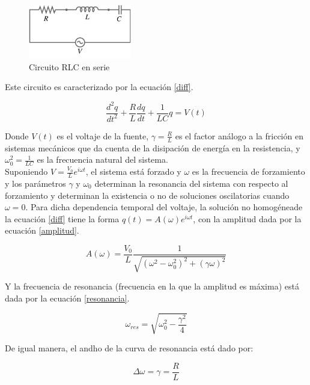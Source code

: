 \documentclass[prb,aps,twocolumn,preprintnumbers,amsmath,amssymb]{revtex4}
\begin{document}
\begin{figure}[h!]
	\centering
	\includegraphics[width=0.4\textwidth]{RLC}
	\caption{Circuito RLC en serie}
	\label{fig: RLC}
\end{figure}

Este circuito es caracterizado por la ecuación \eqref{diff}.

\begin{equation}
\label{diff}
\frac{d^2 q}{d t^2} + \frac{R}{L}\frac{d q}{d t} + \frac{1}{LC}q = V(t)
\end{equation}

Donde $V(t)$ es el voltaje de la fuente, $\gamma = \frac{R}{L}$ es el factor análogo a la fricción en sistemas mecánicos que da cuenta de la disipación de energía en la resistencia, y $\omega_{0}^2 = \frac{1}{LC}$ es la frecuencia natural del sistema.\\

Suponiendo $V = \frac{V_{0}}{L} e^{i\omega t}$, el sistema está forzado y $\omega$ es la frecuencia de forzamiento y los parámetros $\gamma$ y $\omega_{0}$ determinan la resonancia del sistema con respecto al forzamiento  y determinan la existencia o no de soluciones oscilatorias cuando $\omega = 0$. Para dicha dependencia temporal del voltaje, la solución no homogénea\footnotemark[1] de la ecuación \eqref{diff} tiene la forma $q(t) = A(\omega) e^{i \omega t}$, con la amplitud dada por la ecuación \eqref{amplitud}.

\begin{equation}
\label{amplitud}
A(\omega) = \frac{V_{0}}{L}\frac{1}{\sqrt{(\omega^2 - \omega_{0}^2)^2+(\gamma \omega)^2}}
\end{equation}

Y la frecuencia de resonancia (frecuencia en la que la amplitud es máxima) está dada por la ecuación \eqref{resonancia}.

\begin{equation}
\label{resonancia}
\omega_{res} = \sqrt{\omega_{0}^2 - \frac{\gamma^2}{4}}
\end{equation}

De igual manera, el andho de la curva de resonancia está dado por:

\begin{equation}
\label{ancho}
\Delta \omega = \gamma = \frac{R}{L}
\end{equation}
\end{document}
